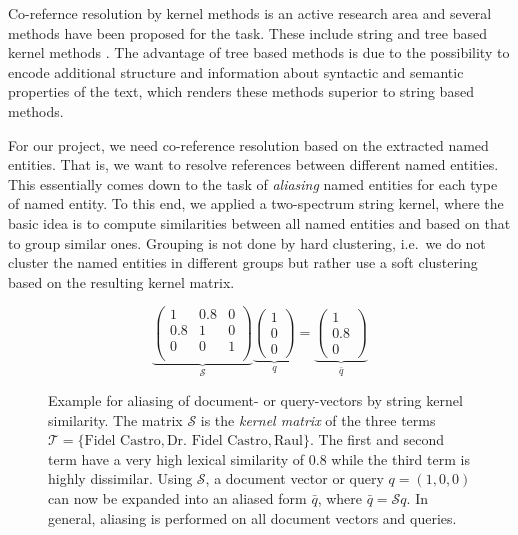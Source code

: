 Co-refernce resolution by kernel methods is an active research area and several methods have been proposed for the task. These include string and tree based kernel methods \cite{string_kernel_coref}.
The advantage of tree based methods is due to the possibility to encode additional structure and information about syntactic and semantic properties of the text, which renders these methods superior to string based methods.

For our project, we need co-reference resolution based on the extracted named entities. That is, we want to resolve references between different named entities. This essentially comes down to the task of \textit{aliasing} named entities for each type of named entity. To this end, we applied a two-spectrum string kernel, where the basic idea is to compute similarities between all named entities and based on that to group similar ones. Grouping is not done by hard clustering, i.e.\ we do not cluster the named entities in different groups but rather use a soft clustering based on the resulting kernel matrix.

\begin{figure}[ht]
  \caption{Example for aliasing of document- or query-vectors by string kernel similarity.
The matrix $\mathcal{S}$ is the \textit{kernel matrix} of the three terms $\mathcal{T} = \lbrace
\text{Fidel Castro},\text{Dr. Fidel Castro}, \text{Raul}\rbrace$. The first and second term have a
very high lexical similarity of $0.8$ while the third term is highly dissimilar. Using
$\mathcal{S}$, a document vector or query $q=(1,0,0)$ can now be expanded into an aliased form
$\bar q$, where $\bar q = \mathcal{S}q$. In general, aliasing is performed on all document vectors
and queries.}
  \[
     \underbrace{\begin{pmatrix}
      1   & 0.8 & 0\\
      0.8 & 1   & 0\\
      0   & 0   & 1\\
     \end{pmatrix}}_{\mathcal{S}}
     \underbrace{\begin{pmatrix}
     1\\ 0\\0 
     \end{pmatrix}}_{q}
     =
     \underbrace{\begin{pmatrix}
     1\\ 0.8\\0 
     \end{pmatrix}}_{\bar q}
  \]
  \label{eq:example_string_sim}
\end{figure}

